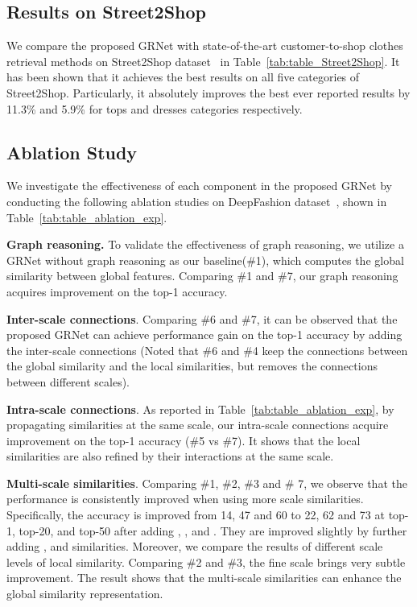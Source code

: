 \documentclass[10pt,twocolumn,letterpaper]{article}
\begin{document}
\subsection{Results on Street2Shop}
We compare the proposed GRNet with state-of-the-art customer-to-shop clothes retrieval methods on Street2Shop dataset~\cite{Kiapour2015} in Table~\ref{tab:table_Street2Shop}. It has been shown that it achieves the best results on all five categories of Street2Shop. Particularly, it absolutely improves the best ever reported results by 11.3\% and 5.9\% for tops and dresses categories respectively.


\subsection{Ablation Study}

We investigate the effectiveness of each component in the proposed GRNet by conducting the following ablation studies on DeepFashion dataset~\cite{Liu2016}, shown in Table~\ref{tab:table_ablation_exp}.

\textbf{Graph reasoning.} To validate the effectiveness of graph reasoning, we utilize a GRNet without graph reasoning as our baseline(\#1), which computes the global similarity between global features.
Comparing \#1 and \#7, our graph reasoning acquires  improvement on the top-1 accuracy.

\textbf{Inter-scale connections}. Comparing \#6 and \#7, it can be observed that the proposed GRNet can achieve  performance gain on the top-1 accuracy by adding the inter-scale connections (Noted that \#6 and \#4 keep the connections between the global similarity and the local similarities, but removes the connections between different scales).

\textbf{Intra-scale connections}. As reported in Table~\ref{tab:table_ablation_exp}, by propagating similarities at the same scale, our intra-scale connections acquire  improvement on the top-1 accuracy (\#5 vs \#7).
It shows that the local similarities are also refined by their interactions at the same scale.


\textbf{Multi-scale similarities}. Comparing \#1, \#2, \#3 and \# 7, we observe that the performance is consistently improved when using more scale similarities. Specifically, the accuracy is improved from 14, 47 and 60 to 22, 62 and 73  at top-1, top-20, and top-50 after adding , , and . They are improved slightly by further adding ,  and  similarities.
Moreover, we compare the results of different scale levels of local similarity. Comparing \#2 and \#3, the fine scale brings very subtle improvement.
The result shows that the multi-scale similarities can enhance the global similarity representation.
\end{document}
